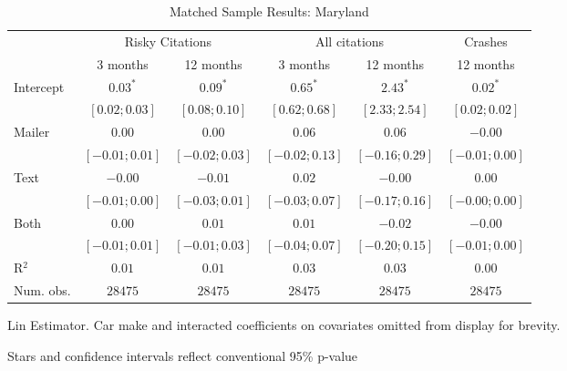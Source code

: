 
\begin{table}
\caption{Matched Sample Results: Maryland}
\begin{center}
\begin{threeparttable}
\begin{tabular}{l c c c c c}
\hline
 & \multicolumn{2}{c}{Risky Citations} & \multicolumn{2}{c}{All citations} & \multicolumn{1}{c}{Crashes} \\
\cline{2-3} \cline{4-5} \cline{6-6}
 & 3 months & 12 months & 3 months & 12 months & 12 months \\
\hline
Intercept & $0.03^{*}$       & $0.09^{*}$       & $0.65^{*}$       & $2.43^{*}$       & $0.02^{*}$       \\
          & $ [ 0.02; 0.03]$ & $ [ 0.08; 0.10]$ & $ [ 0.62; 0.68]$ & $ [ 2.33; 2.54]$ & $ [ 0.02; 0.02]$ \\
Mailer    & $0.00$           & $0.00$           & $0.06$           & $0.06$           & $-0.00$          \\
          & $ [-0.01; 0.01]$ & $ [-0.02; 0.03]$ & $ [-0.02; 0.13]$ & $ [-0.16; 0.29]$ & $ [-0.01; 0.00]$ \\
Text      & $-0.00$          & $-0.01$          & $0.02$           & $-0.00$          & $0.00$           \\
          & $ [-0.01; 0.00]$ & $ [-0.03; 0.01]$ & $ [-0.03; 0.07]$ & $ [-0.17; 0.16]$ & $ [-0.00; 0.00]$ \\
Both      & $0.00$           & $0.01$           & $0.01$           & $-0.02$          & $-0.00$          \\
          & $ [-0.01; 0.01]$ & $ [-0.01; 0.03]$ & $ [-0.04; 0.07]$ & $ [-0.20; 0.15]$ & $ [-0.01; 0.00]$ \\
\hline
R$^2$     & $0.01$           & $0.01$           & $0.03$           & $0.03$           & $0.00$           \\
Num. obs. & $28475$          & $28475$          & $28475$          & $28475$          & $28475$          \\
\hline
\end{tabular}
\begin{tablenotes}[flushleft]
\scriptsize{\item Lin Estimator. Car make and interacted coefficients on covariates omitted from display for brevity.
                             \item Stars and confidence intervals reflect conventional 95\% p-value}
\end{tablenotes}
\end{threeparttable}
\label{table:coefficients}
\end{center}
\end{table}
